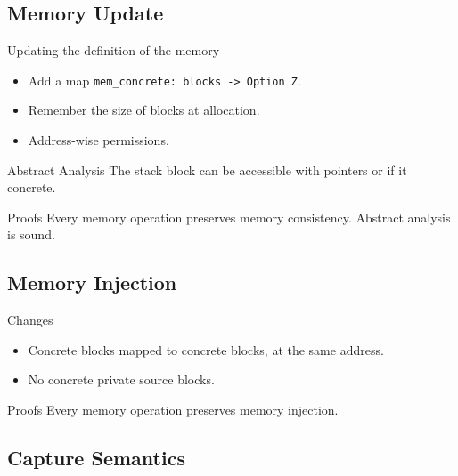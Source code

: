 \subsection{Memory Update}
\begin{frame}{\subsecname}

  \begin{block}{Updating the definition of the memory}
    \begin{itemize}
    \item Add a map \texttt{mem\_concrete: blocks -> Option Z}.
    \item Remember the size of blocks at allocation.
    \item Address-wise permissions.
    \end{itemize}
  \end{block}
  \vfill
  \begin{block}{Abstract Analysis}
    The stack block can be accessible with pointers or if it concrete.
  \end{block}
    \vfill
  \begin{exampleblock}{Proofs}
    Every memory operation preserves memory consistency. Abstract analysis is sound.
  \end{exampleblock}

  
\end{frame}

\subsection{Memory Injection}
\begin{frame}{\subsecname}

  \vfill
  \begin{block}{Changes}
    \begin{itemize}
    \item Concrete blocks mapped to concrete blocks, at the same address.
    \item No concrete private source blocks.
    \end{itemize}
  \end{block}
  \vfill
  \begin{exampleblock}{Proofs}
    Every memory operation preserves memory injection.
  \end{exampleblock}
  
\end{frame}

\subsection{Capture Semantics}
\begin{frame}{\subsecname}

  \\

\end{frame}

